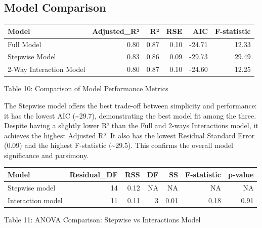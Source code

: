 \documentclass[
  12pt,
]{article}
\begin{document}
\subsection{Model Comparison}\label{model-comparison}

\begingroup\fontsize{8}{10}\selectfont

\begin{longtable}[t]{lrrrrr}
\toprule
Model & Adjusted\_R² & R² & RSE & AIC & F-statistic\\
\midrule
Full Model & 0.80 & 0.87 & 0.10 & -24.71 & 12.33\\
Stepwise Model & 0.83 & 0.86 & 0.09 & -29.73 & 29.49\\
2-Way Interaction Model & 0.80 & 0.87 & 0.10 & -24.60 & 12.25\\
\bottomrule
\end{longtable}
\endgroup{}
\begin{center}
\vspace{-0.5em}
{\fontsize{12}{14}\selectfont Table 10: Comparison of Model Performance Metrics\par}
\end{center}

The Stepwise model offers the best trade-off between simplicity and
performance: it has the lowest AIC (\textasciitilde29.7), demonstrating
the best model fit among the three. Despite having a slightly lower R²
than the Full and 2-ways Interactions model, it achieves the highest
Adjusted R². It also has the lowest Residual Standard Error (0.09) and
the highest F-statistic (\textasciitilde29.5). This confirms the overall
model significance and parsimony.

\begin{table}[!h]
\centering\begingroup\fontsize{8}{10}\selectfont

\begin{tabular}{lrrrrrr}
\toprule
Model & Residual\_DF & RSS & DF & SS & F-statistic & p-value\\
\midrule
Stepwise model & 14 & 0.12 & NA & NA & NA & NA\\
Interaction model & 11 & 0.11 & 3 & 0.01 & 0.18 & 0.91\\
\bottomrule
\end{tabular}
\endgroup{}
\end{table}
\begin{center}
\vspace{-1.6em}
{\fontsize{12}{14}\selectfont Table 11: ANOVA Comparison: Stepwise vs Interactions Model\par}
\end{center}
\end{document}
